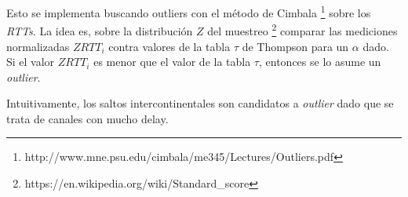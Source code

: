 Esto se implementa buscando outliers con el método de Cimbala \footnote{http://www.mne.psu.edu/cimbala/me345/Lectures/Outliers.pdf} sobre los \emph{RTTs}. La idea es, sobre la distribución $Z$ del muestreo \footnote {https://en.wikipedia.org/wiki/Standard_score} comparar las mediciones normalizadas $ZRTT_i$ contra valores de la tabla $\tau$ de Thompson para un $\alpha$ dado. Si el valor $ZRTT_i$ es menor que el valor de la tabla $\tau$, entonces se lo asume un \emph{outlier}.

Intuitivamente, los saltos intercontinentales son candidatos a \emph{outlier} dado que se trata de canales con mucho delay.
